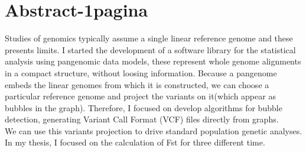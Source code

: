 
\chapter{Abstract-1pagina}
    

\label{Chapter0} %


\newcommand{\keyword}[1]{\textbf{#1}}
\newcommand{\tabhead}[1]{\textbf{#1}}
\newcommand{\code}[1]{\texttt{#1}}
\newcommand{\file}[1]{\texttt{\bfseries#1}}
\newcommand{\option}[1]{\texttt{\itshape#1}}

Studies of genomics typically assume a single linear reference genome and these presents limits. I started the development of a software library for the statistical analysis using pangenomic data models, these represent whole genome alignments in a compact structure, without loosing information. Because a pangenome embeds the linear genomes from which it is constructed, we can choose a particular reference genome and project the variants on it(which appear as bubbles in the graph). Therefore, I focused on develop algorithms for bubble detection, generating Variant Call Format (VCF) files directly from graphs.\\

\noindent
We can use this variants projection to drive standard population genetic analyses. In my thesis, I focused on the calculation of Fst for three different time.

